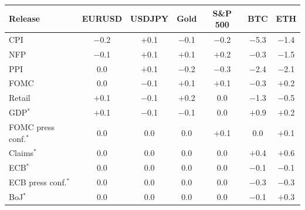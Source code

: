 \begin{tabular}{lcccccc}
\toprule
Release & EURUSD & USDJPY & Gold & S\&P 500 & BTC & ETH \\
\midrule
CPI & $-$0.2 & $+$0.1 & $-$0.1 & $-$0.2 & $-$5.3 & $-$1.4 \\
NFP & $-$0.1 & $+$0.1 & $+$0.1 & $+$0.2 & $-$0.3 & $-$1.5 \\
PPI & 0.0 & $+$0.1 & $-$0.2 & $-$0.3 & $-$2.4 & $-$2.1 \\
FOMC & 0.0 & $-$0.1 & $+$0.1 & $+$0.1 & $-$0.3 & $+$0.2 \\
Retail & $+$0.1 & $-$0.1 & $+$0.2 & 0.0 & $-$1.3 & $-$0.5 \\
\midrule
GDP$^\ast$ & $+$0.1 & $-$0.1 & $-$0.1 & 0.0 & $+$0.9 & $+$0.2 \\
FOMC press conf.$^\ast$ & 0.0 & 0.0 & 0.0 & $+$0.1 & 0.0 & $+$0.1 \\
Claims$^\ast$ & 0.0 & 0.0 & 0.0 & 0.0 & $+$0.4 & $+$0.6 \\
ECB$^\ast$ & 0.0 & 0.0 & 0.0 & 0.0 & $-$0.1 & $-$0.1 \\
ECB press conf.$^\ast$ & 0.0 & 0.0 & 0.0 & 0.0 & $-$0.3 & $-$0.3 \\
BoJ$^\ast$ & 0.0 & 0.0 & 0.0 & 0.0 & $-$0.1 & $+$0.3 \\
\bottomrule
\end{tabular}